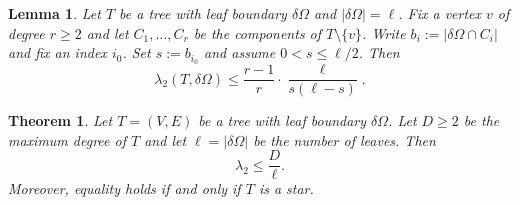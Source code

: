 \documentclass[10pt,a4paper]{amsart}
\newtheorem{theorem}{Theorem}
\newtheorem{lemma}{Lemma}
\newcommand{\dO}{\delta\Omega}
\begin{document}
\begin{lemma}\label{lem:vertex2value}
Let $T$ be a tree with leaf boundary $\dO$ and $|\dO|=\ell$.
Fix a vertex $v$ of degree $r\ge 2$ and let $C_1,\dots,C_r$ be the components of $T\setminus\{v\}$.
Write $b_i:=|\dO\cap C_i|$ and fix an index $i_0$.
Set $s:=b_{i_0}$ and assume $0<s\le\ell/2$.
Then
\begin{equation}\label{eq:vertex2value}
\lambda_2(T,\dO)\le \frac{r-1}{r}\cdot\frac{\ell}{s(\ell-s)}.
\end{equation}
\end{lemma}

\begin{theorem}\label{thm:lambda2sharp}
Let $T=(V,E)$ be a tree with leaf boundary $\dO$.
Let $D\ge 2$ be the maximum degree of $T$ and let $\ell=|\dO|$ be the number of leaves.
Then
\begin{equation}\label{eq:mainbound_intro}
\lambda_2\le \frac{D}{\ell}.
\end{equation}
Moreover, equality holds if and only if $T$ is a star.
\end{theorem}
\end{document}
